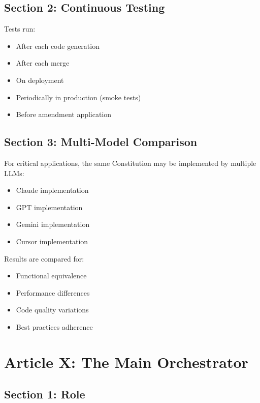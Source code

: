 \documentclass[12pt,letterpaper]{article}
\begin{document}
\subsection{Section 2: Continuous Testing}

Tests run:

\begin{itemize}
    \item After each code generation
    \item After each merge
    \item On deployment
    \item Periodically in production (smoke tests)
    \item Before amendment application
\end{itemize}

\subsection{Section 3: Multi-Model Comparison}

For critical applications, the same Constitution may be implemented by multiple LLMs:

\begin{itemize}
    \item Claude implementation
    \item GPT implementation
    \item Gemini implementation
    \item Cursor implementation
\end{itemize}

Results are compared for:

\begin{itemize}
    \item Functional equivalence
    \item Performance differences
    \item Code quality variations
    \item Best practices adherence
\end{itemize}

\section{Article X: The Main Orchestrator}

\subsection{Section 1: Role}
\end{document}
